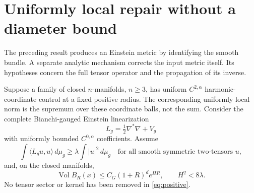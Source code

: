\documentclass[11pt,a4paper]{article}
\theoremstyle{definition}\newtheorem{definition}[theorem]{Definition}
\theoremstyle{remark}\newtheorem{remark}[theorem]{Remark}
\DeclareMathOperator{\Vol}{Vol}
\newcommand{\dd}{\,d\mu_g}
\begin{document}
\section{Uniformly local repair without a diameter bound}\label{sec:weighted}
The preceding result produces an Einstein metric by identifying the smooth bundle. A separate analytic mechanism corrects the input metric itself. Its hypotheses concern the full tensor operator and the propagation of its inverse.

Suppose a family of closed $n$-manifolds, $n\ge3$, has uniform $C^{2,\alpha}$ harmonic-coordinate control at a fixed positive radius. The corresponding uniformly local norm is the supremum over these coordinate balls, not the sum. Consider the complete Bianchi-gauged Einstein linearization
\[
 L_g=\tfrac12\nabla^*\nabla+V_g
\]
with uniformly bounded $C^{0,\alpha}$ coefficients. Assume
\begin{equation}\label{eq:positive}
 \int\langle L_gu,u\rangle\dd\ge\lambda\int|u|^2\dd
 \quad\text{for all smooth symmetric two-tensors }u,
\end{equation}
and, on the closed manifolds,
\begin{equation}\label{eq:growth}
 \Vol B_R(x)\le C_G(1+R)^d e^{HR},\qquad H^2<8\lambda.
\end{equation}
No tensor sector or kernel has been removed in \eqref{eq:positive}.
\end{document}
